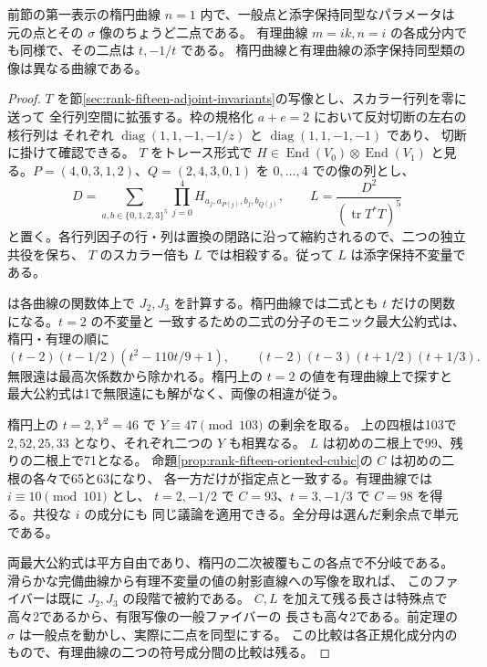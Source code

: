 \begin{theorem}\label{thm:endpoint-generic-fibers}
前節の第一表示の楕円曲線 $n=1$ 内で、一般点と添字保持同型なパラメータは
元の点とその $\sigma$ 像のちょうど二点である。
有理曲線 $m=ik,n=i$ の各成分内でも同様で、その二点は $t,-1/t$ である。
楕円曲線と有理曲線の添字保持同型類の像は異なる曲線である。
\end{theorem}
\begin{proof}
$T$ を節\ref{sec:rank-fifteen-adjoint-invariants}の写像とし、スカラー行列を零に送って
全行列空間に拡張する。枠の規格化 $a+e=2$ において反対切断の左右の核行列は
それぞれ $\operatorname{diag}(1,1,-1,-1/z)$ と $\operatorname{diag}(1,1,-1,-1)$ であり、
切断に掛けて確認できる。
$T$ をトレース形式で $H\in\operatorname{End}(V_0)\otimes\operatorname{End}(V_1)$
と見る。$P=(4,0,3,1,2)$、$Q=(2,4,3,0,1)$ を $0,\ldots,4$ での像の列とし、
\[
 D=\sum_{a,b\in\{0,1,2,3\}^5}
       \prod_{j=0}^4 H_{a_j,a_{P(j)},b_j,b_{Q(j)}},\qquad
 L=\frac{D^2}{(\operatorname{tr} T^*T)^5}
\]
と置く。各行列因子の行・列は置換の閉路に沿って縮約されるので、二つの独立共役を保ち、
$T$ のスカラー倍も $L$ では相殺する。従って $L$ は添字保持不変量である。

 は各曲線の関数体上で
$J_2,J_3$ を計算する。楕円曲線では二式とも $t$ だけの関数になる。$t=2$ の不変量と
一致するための二式の分子のモニック最大公約式は、楕円・有理の順に
\[
 (t-2)(t-1/2)(t^2-110t/9+1),\qquad
 (t-2)(t-3)(t+1/2)(t+1/3).
\]
無限遠は最高次係数から除かれる。楕円上の $t=2$ の値を有理曲線上で探すと
最大公約式は1で無限遠にも解がなく、両像の相違が従う。

楕円上の $t=2,Y^2=46$ で $Y\equiv47\pmod{103}$ の剰余を取る。
上の四根は103で $2,52,25,33$ となり、それぞれ二つの $Y$ も相異なる。
$L$ は初めの二根上で99、残りの二根上で71となる。
命題\ref{prop:rank-fifteen-oriented-cubic}の $C$ は初めの二根の各々で65と63になり、
各一方だけが指定点と一致する。有理曲線では $i\equiv10\pmod{101}$ とし、
$t=2,-1/2$ で $C=93$、$t=3,-1/3$ で $C=98$ を得る。共役な $i$ の成分にも
同じ議論を適用できる。全分母は選んだ剰余点で単元である。

両最大公約式は平方自由であり、楕円の二次被覆もこの各点で不分岐である。
滑らかな完備曲線から有理不変量の値の射影直線への写像を取れば、
このファイバーは既に $J_2,J_3$ の段階で被約である。
$C,L$ を加えて残る長さは特殊点で高々2であるから、有限写像の一般ファイバーの
長さも高々2である。前定理の $\sigma$ は一般点を動かし、実際に二点を同型にする。
この比較は各正規化成分内のもので、有理曲線の二つの符号成分間の比較は残る。
\end{proof}
